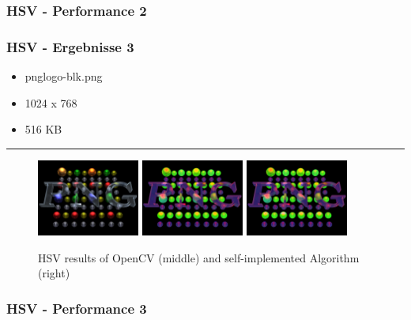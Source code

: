 \begin{frame}
    \frametitle{HSV - Performance 2}

    

\end{frame}

\begin{frame}
    \frametitle{HSV - Ergebnisse 3}

    \begin{itemize}
        \item pnglogo-blk.png
        \item 1024 x 768
        \item 516 KB
    \end{itemize}

    \hfill
    \hrule
    \hfill

    \begin{figure}[H]
        \centering
    
        \includegraphics[width=0.30\textwidth]{images/pnglogo-blk.png}
        \includegraphics[width=0.30\textwidth]{images/results/hsv-cv.pnglogo-blk.png}
        \includegraphics[width=0.30\textwidth]{images/results/hsv-my.pnglogo-blk.png}

        
        \begin{center}
            \caption{HSV results of OpenCV (middle) and self-implemented  Algorithm (right)}            
        \end{center}

        \label{fig:hsv3}
    \end{figure}
\end{frame}

\begin{frame}
    \frametitle{HSV - Performance 3}

    

\end{frame}